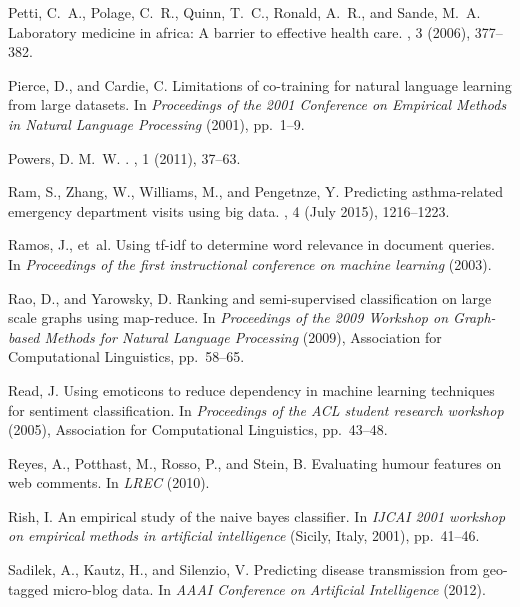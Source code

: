 \documentclass[10pt,letterpaper]{article}
\begin{document}
\begin{thebibliography}{10}
{\sc Petti, C.~A., Polage, C.~R., Quinn, T.~C., Ronald, A.~R., and Sande,
  M.~A.}
\newblock Laboratory medicine in africa: A barrier to effective health care.
, 3 (2006), 377--382.

{\sc Pierce, D., and Cardie, C.}
\newblock Limitations of co-training for natural language learning from large
  datasets.
\newblock In {\em Proceedings of the 2001 Conference on Empirical Methods in
  Natural Language Processing\/} (2001), pp.~1--9.

{\sc Powers, D. M.~W.}
.
, 1 (2011), 37--63.

{\sc Ram, S., Zhang, W., Williams, M., and Pengetnze, Y.}
\newblock Predicting asthma-related emergency department visits using big data.
, 4 (July
  2015), 1216--1223.

{\sc Ramos, J., et~al.}
\newblock Using tf-idf to determine word relevance in document queries.
\newblock In {\em Proceedings of the first instructional conference on machine
  learning\/} (2003).

{\sc Rao, D., and Yarowsky, D.}
\newblock Ranking and semi-supervised classification on large scale graphs
  using map-reduce.
\newblock In {\em Proceedings of the 2009 Workshop on Graph-based Methods for
  Natural Language Processing\/} (2009), Association for Computational
  Linguistics, pp.~58--65.

{\sc Read, J.}
\newblock Using emoticons to reduce dependency in machine learning techniques
  for sentiment classification.
\newblock In {\em Proceedings of the ACL student research workshop\/} (2005),
  Association for Computational Linguistics, pp.~43--48.

{\sc Reyes, A., Potthast, M., Rosso, P., and Stein, B.}
\newblock Evaluating humour features on web comments.
\newblock In {\em LREC\/} (2010).

{\sc Rish, I.}
\newblock An empirical study of the naive bayes classifier.
\newblock In {\em IJCAI 2001 workshop on empirical methods in artificial
  intelligence\/} (Sicily, Italy, 2001), pp.~41--46.

{\sc Sadilek, A., Kautz, H., and Silenzio, V.}
\newblock Predicting disease transmission from geo-tagged micro-blog data.
\newblock In {\em AAAI Conference on Artificial Intelligence\/} (2012).


\end{thebibliography}
\end{document}
